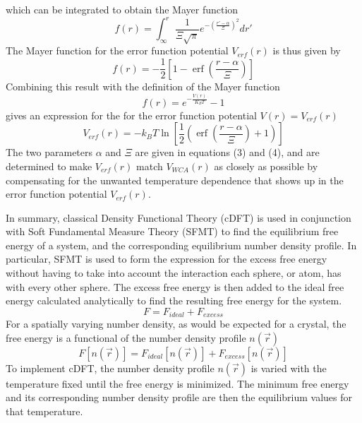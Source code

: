 \documentclass[12pt]{article}
\begin{document}
which can be integrated to obtain the Mayer function
\begin{equation}{f(r)=\int_{\infty}^r{ \frac{1}{\Xi\sqrt{\pi}}e^{-\left(\frac{r'-\alpha}{\Xi}\right)^2}{dr'}}}\end{equation} 
The Mayer function for the error function potential $V_{erf}(r)$ is thus given by
\begin{equation}{f(r)=-\frac{1}{2}\left[1-\operatorname{erf}\left(\frac{r-\alpha}{\Xi}\right)\right]}\end{equation} Combining this result with the definition of the Mayer function \begin{displaymath}f(r)=e^{-\frac{V(r)}{K_BT}}-1\end{displaymath} %
gives an expression for the for the error function potential  $V(r)=V_{erf}(r)$ 
\begin{equation}{V_{erf}(r)=-k_BT\ln\left[\frac{1}{2}\left(\operatorname{erf}\left(\frac{r-\alpha}{\Xi}\right)+1\right)\right]}\end{equation} The two parameters $\alpha$ and $\Xi$ are given in equations (3) and (4), and are determined to make $V_{erf}(r)$ match $V_{WCA}(r)$ as closely as possible by compensating for the unwanted temperature dependence that shows up in the error function potential $V_{erf}(r)$.

In summary, classical Density Functional Theory (cDFT) is used in conjunction with Soft Fundamental Measure Theory (SFMT) to find the equilibrium free energy of a system, and the corresponding equilibrium number density profile. In particular, SFMT is used to form the expression for the excess free energy without having to take into account the interaction each sphere, or atom, has with every other sphere. The excess free energy is then added to the ideal free energy calculated analytically to find the resulting free energy for the system. 
\begin{equation}{F=F_{ideal} + F_{excess}}\end{equation} 
For a spatially varying number density, as would be expected for a crystal, the free energy is a functional of the number density profile $n(\vec{r})$  
\begin{equation}{F[n(\vec{r})]=F_{ideal}[n(\vec{r})] + F_{excess}[n(\vec{r})]}\end{equation} To implement cDFT, the number density profile $n(\vec{r})$ is varied with the temperature fixed until the free energy is minimized. The minimum free energy and its corresponding number density profile are then the equilibrium values for that temperature.  
\end{document}
